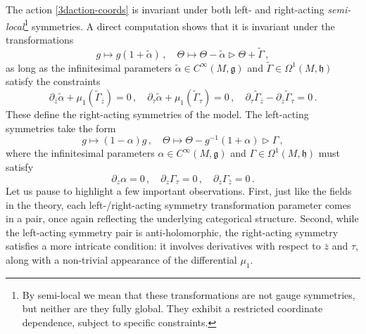 \documentclass[11pt]{amsart}
\newcommand{\fg}{\mathfrak{g}}
\newcommand{\fh}{\mathfrak{h}}
\numberwithin{equation}{section}
\numberwithin{figure}{section}
\numberwithin{table}{section}
\theoremstyle{thm}
\numberwithin{equation}{subsection}
\theoremstyle{definition}
\theoremstyle{rem}
\begin{document}
The action \eqref{3daction-coords} is invariant under both left- and right-acting \emph{semi-local}\footnote{By semi-local we mean that these transformations are not gauge symmetries, but neither are they fully global. They exhibit a restricted coordinate dependence, subject to specific constraints.} symmetries. A direct computation shows that it is invariant under the transformations
\begin{equation}
\label{ec:3dleftsym}
    g \mapsto g(1 + \tilde\alpha) \,, \quad \Theta \mapsto \Theta-\tilde\alpha \rhd \Theta + \tilde\Gamma \,,
\end{equation}
as long as the infinitesimal parameters \(\tilde\alpha \in C^{\infty}(M, \fg)\) and \(\tilde\Gamma \in \Omega^{1}(M, \fh)\) satisfy the constraints
\begin{equation}
\label{ec:3drightsymconst}
    \partial_{\bar z} \tilde\alpha + \mu_1(\tilde\Gamma_{\bar z}) = 0\,, \quad 
    \partial_{\tau} \tilde\alpha + \mu_1(\tilde\Gamma_{\tau}) = 0\,, \quad 
    \partial_\tau \tilde\Gamma_{\bar z} - \partial_{\bar z} \tilde\Gamma_\tau = 0\,.
\end{equation}
These define the right-acting symmetries of the model. The left-acting symmetries take the form
\begin{equation}
\label{ec:3drightsym}
    g \mapsto (1 - \alpha)g \,, \quad \Theta \mapsto \Theta - g^{-1}(1 + \alpha) \rhd \Gamma \,,
\end{equation}
where the infinitesimal parameters \(\alpha \in C^{\infty}(M, \fg)\) and \(\Gamma \in \Omega^{1}(M, \fh)\) must satisfy
\begin{equation}
\label{ec:3dleftsymconst}
    \partial_z \alpha = 0\,, \quad \partial_z \Gamma_\tau = 0\,, \quad \partial_z \Gamma_{\bar z} = 0\,.
\end{equation}
Let us pause to highlight a few important observations. First, just like the fields in the theory, each left-/right-acting symmetry transformation parameter comes in a pair, once again reflecting the underlying categorical structure. Second, while the left-acting symmetry pair is anti-holomorphic, the right-acting symmetry satisfies a more intricate condition: it involves derivatives with respect to $\bar z$ and $\tau$, along with a non-trivial appearance of the differential $\mu_1$. 

\end{document}
